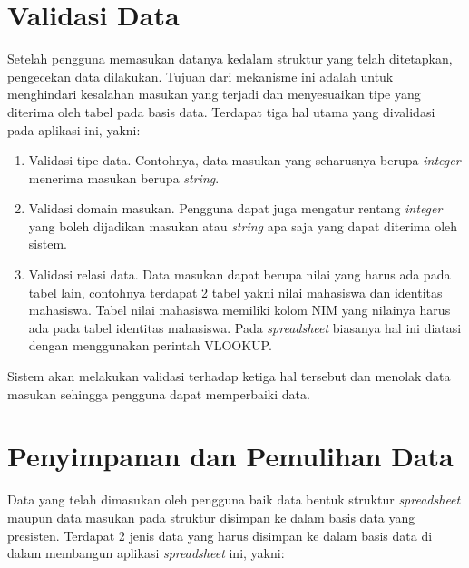 \section{Validasi Data}
Setelah pengguna memasukan datanya kedalam struktur yang telah ditetapkan, pengecekan data dilakukan. Tujuan dari mekanisme ini adalah untuk menghindari kesalahan masukan yang terjadi dan menyesuaikan tipe yang diterima oleh tabel pada basis data. Terdapat tiga hal utama yang divalidasi pada aplikasi ini, yakni:
\begin{enumerate}
	\item Validasi tipe data. Contohnya, data masukan yang seharusnya berupa \textit{integer} menerima masukan berupa \textit{string}.
	\item Validasi domain masukan. Pengguna dapat juga mengatur rentang \textit{integer} yang boleh dijadikan masukan atau \textit{string} apa saja yang dapat diterima oleh sistem.
	\item Validasi relasi data. Data masukan dapat berupa nilai yang harus ada pada tabel lain, contohnya terdapat 2 tabel yakni nilai mahasiswa dan identitas mahasiswa. Tabel nilai mahasiswa memiliki kolom NIM yang nilainya harus ada pada tabel identitas mahasiswa. Pada \textit{spreadsheet} biasanya hal ini diatasi dengan menggunakan perintah VLOOKUP.
\end{enumerate}
Sistem akan melakukan validasi terhadap ketiga hal tersebut dan menolak data masukan sehingga pengguna dapat memperbaiki data. 

\section{Penyimpanan dan Pemulihan Data}
Data yang telah dimasukan oleh pengguna baik data bentuk struktur \textit{spreadsheet} maupun data masukan pada struktur disimpan ke dalam basis data yang presisten. Terdapat 2 jenis data yang harus disimpan ke dalam basis data di dalam membangun aplikasi \textit{spreadsheet} ini, yakni:

